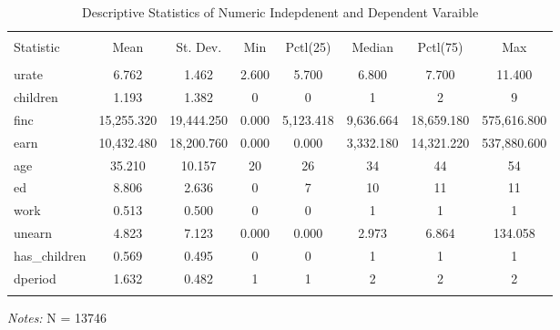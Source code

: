 \documentclass[a4paper]{article}
\begin{document}
\begin{table}[!htbp] 
\begin{adjustwidth}{-0cm}{-0cm}
\begin{threeparttable}
\small
\captionsetup{font=small, justification=raggedright,singlelinecheck=false}
  \caption{Descriptive Statistics of Numeric Indepdenent and Dependent Varaible} 
  \label{} 
\begin{tabular}{@{\extracolsep{5pt}}lccccccc} 
\\[-5.8ex]\hline 
\hline \\[-1.8ex] 
Statistic & \multicolumn{1}{c}{Mean} & \multicolumn{1}{c}{St. Dev.} & \multicolumn{1}{c}{Min} & \multicolumn{1}{c}{Pctl(25)} & \multicolumn{1}{c}{Median} & \multicolumn{1}{c}{Pctl(75)} & \multicolumn{1}{c}{Max} \\ 
\hline \\[-1.8ex] 
urate & 6.762 & 1.462 & 2.600 & 5.700 & 6.800 & 7.700 & 11.400 \\ 
children & 1.193 & 1.382 & 0 & 0 & 1 & 2 & 9 \\ 
finc & 15,255.320 & 19,444.250 & 0.000 & 5,123.418 & 9,636.664 & 18,659.180 & 575,616.800 \\ 
earn & 10,432.480 & 18,200.760 & 0.000 & 0.000 & 3,332.180 & 14,321.220 & 537,880.600 \\ 
age & 35.210 & 10.157 & 20 & 26 & 34 & 44 & 54 \\ 
ed & 8.806 & 2.636 & 0 & 7 & 10 & 11 & 11 \\ 
work & 0.513 & 0.500 & 0 & 0 & 1 & 1 & 1 \\ 
unearn & 4.823 & 7.123 & 0.000 & 0.000 & 2.973 & 6.864 & 134.058 \\ 
has\_children & 0.569 & 0.495 & 0 & 0 & 1 & 1 & 1 \\ 
dperiod & 1.632 & 0.482 & 1 & 1 & 2 & 2 & 2 \\
\hline \\[-3.6ex] 
\end{tabular} 
\begin{tablenotes}
      \small
      \item\textit{Notes:} N = 13746
    \end{tablenotes}
\end{threeparttable}
\end{adjustwidth}
\end{table}
\end{document}
